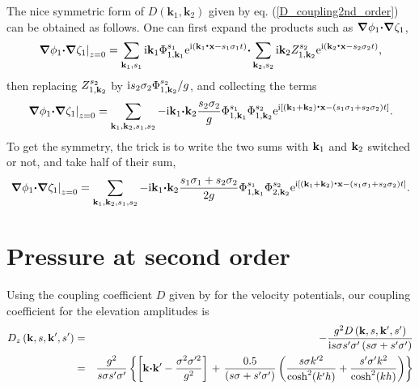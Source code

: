 The nice symmetric 
form of  $D\left({\mathbf k_1},{\mathbf k_2}\right)$ given by eq. (\ref{D_coupling2nd_order}) can be obtained as follows.  
One can first expand the products such as $\mbox{\boldmath $\nabla$}\phi_1 \mbox{\boldmath $\cdot$}\mbox{\boldmath $\nabla$} \zeta_1$,
\begin{equation}
    \left.\mbox{\boldmath $\nabla$}\phi_1 \mbox{\boldmath $\cdot$}\mbox{\boldmath $\nabla$} \zeta_1\right|_{z=0}=
\sum_{\mathbf{k}_1,s_1}
    \mathrm{i} \mathbf{k}_1 \Phi _{1,\mathbf{k}_1}^{s_1} \mathrm{e}^{\mathrm{i}
    \left(\mathbf{k}_1\mbox{\boldmath $\cdot$}{\mathbf x} - s_1 \sigma_1 t\right)} \mbox{\boldmath $\cdot$} \sum_{{\mathbf k_2},s_2}
     \mathrm{i} \mathbf{k}_2 Z _{1,\mathbf{k}_2}^{s_2} \mathrm{e}^{\mathrm{i}
    \left(\mathbf{k}_2\mbox{\boldmath $\cdot$}{\mathbf x} - s_2 \sigma_2 t\right)},
  \label{dotprod}
\end{equation}
then replacing $Z _{1,\mathbf{k}_2}^{s_2}$ by $\mathrm{i} s_2 \sigma_2 \Phi _{1,\mathbf{k}_2}^{s_2}/g$, and collecting the terms 
\begin{equation}
    \left.\mbox{\boldmath $\nabla$}\phi_1 \mbox{\boldmath $\cdot$}\mbox{\boldmath $\nabla$} \zeta_1\right|_{z=0}=
\sum_{\mathbf{k}_1,\mathbf{k}_2,s_1,s_2}
    -\mathrm{i} \mathbf{k}_1 \mbox{\boldmath $\cdot$} \mathbf{k}_2  \frac{s_2 \sigma_2}{g} \Phi _{1,\mathbf{k}_1}^{s_1} \Phi _{1,\mathbf{k}_2}^{s_2} \mathrm{e}^{\mathrm{i}
    \left[\left(\mathbf{k}_1+\mathbf{k}_2\right)\mbox{\boldmath $\cdot$}{\mathbf x} - \left(s_1 \sigma_1+s_2 \sigma_2\right) t\right]}
  \label{dotprod2}.
\end{equation}
To get the symmetry, the trick is to write the two sums with $\mathbf{k}_1$ and $\mathbf{k}_2$ switched or not, and take half 
of their sum, 
\begin{equation}
    \left.\mbox{\boldmath $\nabla$}\phi_1 \mbox{\boldmath $\cdot$}\mbox{\boldmath $\nabla$} \zeta_1\right|_{z=0}=
\sum_{\mathbf{k}_1,\mathbf{k}_2,s_1,s_2}
    -\mathrm{i} \mathbf{k}_1 \mbox{\boldmath $\cdot$} \mathbf{k}_2 \frac{s_1 \sigma_1 +  s_2 \sigma_2}{2g} \Phi _{1,\mathbf{k}_1}^{s_1} \Phi _{2,\mathbf{k}_2}^{s_2} \mathrm{e}^{\mathrm{i}
    \left[\left(\mathbf{k}_1+\mathbf{k}_2\right)\mbox{\boldmath $\cdot$}{\mathbf x} - \left(s_1 \sigma_1+s_2 \sigma_2\right) t\right]}.
  \label{dotprod3}
\end{equation}


\section{Pressure at second order}
Using the coupling coefficient $D$ given by \citet[][eq. 4.3]{Hasselmann1962} 
for the velocity potentials, our coupling coefficient for the elevation amplitudes is  
\begin{eqnarray}
  D_z\left(\mathbf{k},s,\mathbf{k^{\prime}},s'\right)& = & - \frac{ g^2 D \left(\mathbf{k},s,\mathbf{k^{\prime}},s'\right)  }{ \mathrm{i} s \sigma s'\sigma' \left(s \sigma+s' \sigma'\right) } 
  \nonumber \\
& =& \frac{g^2}{s \sigma s' \sigma'} \left\{  \left[\mathbf{k} \mbox{\boldmath $\cdot$} \mathbf{k^{\prime}} - \frac{ \sigma^2 \sigma'^2}{g^2}  \right] \right. 
   +\left. \frac{0.5}{ \left(s \sigma+s' \sigma'\right)} 
\left(\frac{s \sigma k'^2}{ \cosh^2(k'h)}+\frac{s' \sigma' k^2}{ \cosh^2(k h)}\right)\right\} \nonumber \\
\label{Dz}
\end{eqnarray}

